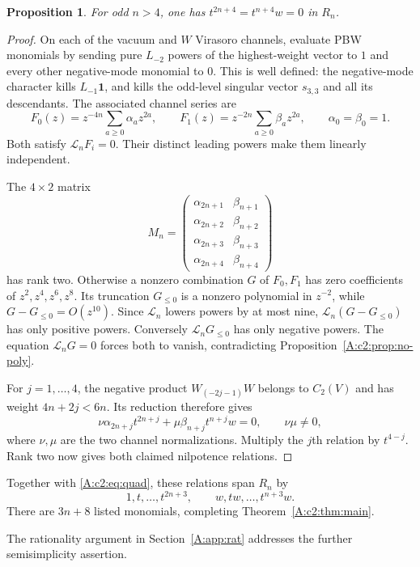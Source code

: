 \documentclass[11pt]{article}
\newtheorem{proposition}[theorem]{Proposition}
\numberwithin{equation}{section}
\begin{document}
\begin{proposition}\label{A:c2:prop:bound}
For odd $n>4$, one has $t^{2n+4}=t^{n+4}w=0$ in $R_n$.
\end{proposition}
\begin{proof}
On each of the vacuum and $W$ Virasoro channels, evaluate PBW monomials by sending pure $L_{-2}$ powers of the highest-weight vector to $1$ and every other negative-mode monomial to $0$. This is well defined: the negative-mode character kills $L_{-1}\mathbf1$, and kills the odd-level singular vector $s_{3,3}$ and all its descendants. The associated channel series are
\[
 F_0(z)=z^{-4n}\sum_{a\geq0}\alpha_a z^{2a},\qquad
 F_1(z)=z^{-2n}\sum_{a\geq0}\beta_a z^{2a},\qquad
 \alpha_0=\beta_0=1.
\]
Both satisfy $\mathcal L_nF_i=0$. Their distinct leading powers make them linearly independent.

The $4\times2$ matrix
\[
 M_n=\begin{pmatrix}
 \alpha_{2n+1}&\beta_{n+1}\\
 \alpha_{2n+2}&\beta_{n+2}\\
 \alpha_{2n+3}&\beta_{n+3}\\
 \alpha_{2n+4}&\beta_{n+4}
 \end{pmatrix}
\]
has rank two. Otherwise a nonzero combination $G$ of $F_0,F_1$ has zero coefficients of $z^2,z^4,z^6,z^8$. Its truncation $G_{\leq0}$ is a nonzero polynomial in $z^{-2}$, while $G-G_{\leq0}=O(z^{10})$. Since $\mathcal L_n$ lowers powers by at most nine, $\mathcal L_n(G-G_{\leq0})$ has only positive powers. Conversely $\mathcal L_nG_{\leq0}$ has only negative powers. The equation $\mathcal L_nG=0$ forces both to vanish, contradicting Proposition~\ref{A:c2:prop:no-poly}.

For $j=1,\ldots,4$, the negative product $W_{(-2j-1)}W$ belongs to $C_2(V)$ and has weight $4n+2j<6n$. Its reduction therefore gives
\[
 \nu\alpha_{2n+j}t^{2n+j}
   +\mu\beta_{n+j}t^{n+j}w=0,
 \qquad \nu\mu\ne0,
\]
where $\nu,\mu$ are the two channel normalizations. Multiply the $j$th relation by $t^{4-j}$. Rank two now gives both claimed nilpotence relations.
\end{proof}
Together with \eqref{A:c2:eq:quad}, these relations span $R_n$ by
\[
 1,t,\ldots,t^{2n+3},\qquad w,tw,\ldots,t^{n+3}w.
\]
There are $3n+8$ listed monomials, completing Theorem~\ref{A:c2:thm:main}.


The rationality argument in Section~\ref{A:app:rat} addresses the further semisimplicity assertion.

\end{document}
